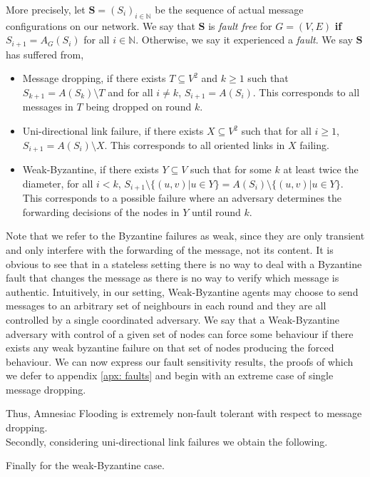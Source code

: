     More precisely, let $\mathbf{S}=(S_{i})_{i \in \mathbb{N}}$ be the sequence of actual message configurations on our network. 
    We say that $\mathbf{S}$ is \emph{fault free} for $G=(V,E)$ \textbf{if} $S_{i+1}=A_{G}(S_{i})$ for all $i \in \mathbb{N}$.
    Otherwise, we say it experienced a \emph{fault}. We say $\mathbf{S}$ has suffered from,
     
    \begin{itemize}
        \item Message dropping, if there exists $T\subseteq V^2$ and $k\geq 1$ such that $S_{k+1}=A(S_k)\setminus T$ and for all $i\neq k$, $S_{i+1}=A(S_i)$. This corresponds to all messages in $T$ being dropped on round $k$.
        \item Uni-directional link failure, if there exists $X\subseteq V^2$ such that for all $i\geq 1$, $S_{i+1}=A(S_i)\setminus X$. This corresponds to all oriented links in $X$ failing.
        \item Weak-Byzantine, if there exists $Y \subseteq V$ such that for some $k$ at least twice the diameter, for all $i<k$, $S_{i+1}\setminus\{(u,v)|u \in Y\}=A(S_i)\setminus\{(u,v)|u \in Y\}$. This corresponds to a possible failure where an adversary determines the forwarding decisions of the nodes in $Y$ until round $k$.
    \end{itemize}
    Note that we refer to the Byzantine failures as weak, since they are only transient and only interfere with the forwarding of the message, not its content. It is obvious to see that in a stateless setting there is no way to deal with a Byzantine fault that changes the message as there is no way to verify which message is authentic. Intuitively, in our setting, Weak-Byzantine agents may choose to send messages to an arbitrary set of neighbours in each round and they are all controlled by a single coordinated adversary. We say that a Weak-Byzantine adversary with control of a given set of nodes can force some behaviour if there exists any weak byzantine failure on that set of nodes producing the forced behaviour. We can now express our fault sensitivity results, the proofs of which we defer to appendix \ref{apx: faults} and begin with an extreme case of single message dropping.
    
    Thus, Amnesiac Flooding is extremely non-fault tolerant with respect to message dropping.\\
    Secondly, considering uni-directional link failures we obtain the following.
    
     Finally for the weak-Byzantine case.
     
